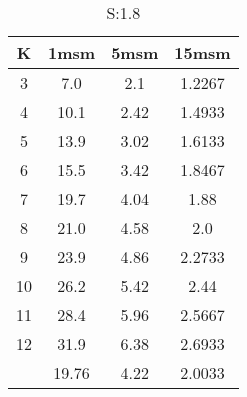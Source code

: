 \begin{table}[H]
\centering
\begin{tabular}{c|ccc}
K &1msm &5msm &15msm\\
\hline
3 & 7.0 & 2.1 & 1.2267\\
4 & 10.1 & 2.42 & 1.4933\\
5 & 13.9 & 3.02 & 1.6133\\
6 & 15.5 & 3.42 & 1.8467\\
7 & 19.7 & 4.04 & 1.88\\
8 & 21.0 & 4.58 & 2.0\\
9 & 23.9 & 4.86 & 2.2733\\
10 & 26.2 & 5.42 & 2.44\\
11 & 28.4 & 5.96 & 2.5667\\
12 & 31.9 & 6.38 & 2.6933\\
\hline
& 19.76 & 4.22 & 2.0033\\
\end{tabular}
\caption{S:1.8}
\label{tab:s1.8}
\end{table}
